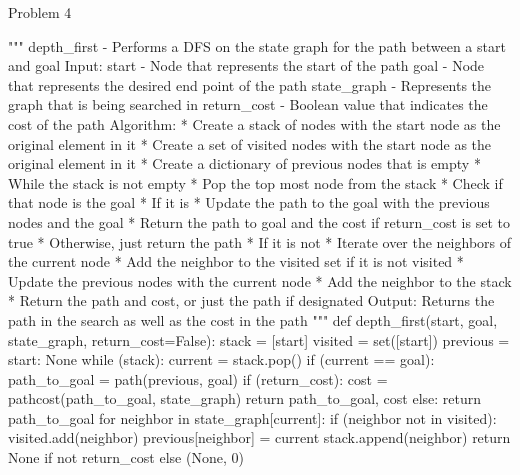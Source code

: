 \begin{problem}{Problem 4}
\begin{highlight}[Solution]
\begin{code}[Python]
    """ depth_first - Performs a DFS on the state graph for the path between a start and goal
        Input:
            start - Node that represents the start of the path
            goal - Node that represents the desired end point of the path
            state_graph - Represents the graph that is being searched in
            return_cost - Boolean value that indicates the cost of the path
        Algorithm:
            * Create a stack of nodes with the start node as the original element in it
            * Create a set of visited nodes with the start node as the original element in it
            * Create a dictionary of previous nodes that is empty
            * While the stack is not empty
                * Pop the top most node from the stack
                * Check if that node is the goal
                * If it is
                    * Update the path to the goal with the previous nodes and the goal
                    * Return the path to goal and the cost if return_cost is set to true
                    * Otherwise, just return the path
                * If it is not
                    * Iterate over the neighbors of the current node
                    * Add the neighbor to the visited set if it is not visited
                    * Update the previous nodes with the current node
                    * Add the neighbor to the stack
            * Return the path and cost, or just the path if designated
        Output:
            Returns the path in the search as well as the cost in the path
    """
    def depth_first(start, goal, state_graph, return_cost=False):
        stack = [start]
        visited = set([start])
        previous = {start: None}
        while (stack):
            current = stack.pop()
            if (current == goal):
                path_to_goal = path(previous, goal)
                if (return_cost):
                    cost = pathcost(path_to_goal, state_graph)
                    return path_to_goal, cost
                else:
                    return path_to_goal
            for neighbor in state_graph[current]:
                if (neighbor not in visited):
                    visited.add(neighbor)
                    previous[neighbor] = current
                    stack.append(neighbor)
        return None if not return_cost else (None, 0)
    

\end{code}
\end{highlight}
\end{problem}

